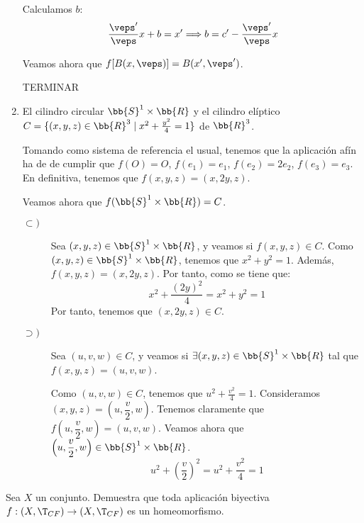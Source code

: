 \begin{ejercicio}
\begin{enumerate}
        Calculamos $b$:
        \begin{equation*}
            \frac{\veps'}{\veps} x + b=x'\Longrightarrow b=c'-\frac{\veps'}{\veps}x
        \end{equation*}

        Veamos ahora que $f[B(x,\veps)]=B(x',\veps')$.

        TERMINAR

        

        


        
        \item El cilindro circular $\bb{S}^1 \times \bb{R}$ y el cilindro elíptico $C = \{(x, y, z) \in \bb{R}^3 \mid x^2 +\frac{y^2}{4} = 1\}$ de $\bb{R}^3$.

        Tomando como sistema de referencia el usual, tenemos que la aplicación afín ha de de cumplir que $f(O)=O$, $f(e_1)=e_1$, $f(e_2)=2e_2$, $f(e_3)=e_3$. En definitiva, tenemos que $f(x,y,z)=(x,2y,z)$.

        Veamos ahora que $f(\bb{S}^1\times \bb{R})=C$.
        \begin{description}
            \item[$\subset)$]
            Sea $(x,y,z)\in \bb{S}^1\times \bb{R}$, y veamos si $f(x,y,z)\in C$. Como $(x,y,z)\in \bb{S}^1\times \bb{R}$, tenemos que $x^2+y^2=1$. Además, $f(x,y,z)=(x,2y,z)$. Por tanto, como se tiene que:
            \begin{equation*}
                x^2 + \frac{(2y)^2}{4}=x^2+y^2 = 1
            \end{equation*}
            Por tanto, tenemos que $(x,2y,z)\in C$.

            \item[$\supset)$] Sea $(u,v,w)\in C$, y veamos si $\exists (x,y,z)\in \bb{S}^1\times \bb{R}$ tal que $f(x,y,z)=(u,v,w)$.

            Como $(u,v,w)\in C$, tenemos que $u^2 + \frac{v^2}{4}=1$. Consideramos $(x,y,z)=\left(u,\dfrac{v}{2}, w\right)$. Tenemos claramente que $f\left(u,\dfrac{v}{2}, w\right)=(u,v,w)$. Veamos ahora que $\left(u,\dfrac{v}{2}, w\right)\in \bb{S}^1\times \bb{R}$.
            $$u^2 + \left(\frac{v}{2}\right)^2=u^2 + \frac{v^2}{4}=1$$
        \end{description}
    \end{enumerate}
\end{ejercicio}

\begin{ejercicio}
    Sea $X$ un conjunto. Demuestra que toda aplicación biyectiva $f : (X, \T_{CF}) \to (X, \T_{CF})$ es un homeomorfismo.
\end{ejercicio}

